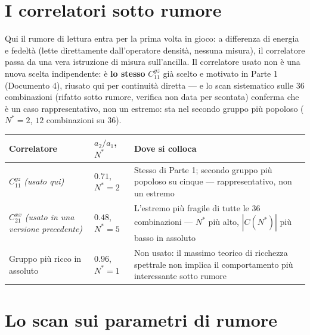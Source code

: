 \documentclass[11pt,a4paper]{article}
\begin{document}
\section{I correlatori sotto rumore}

Qui il rumore di lettura entra per la prima volta in gioco: a differenza
di energia e fedeltà (lette direttamente dall'operatore densità, nessuna
misura), il correlatore passa da una vera istruzione di misura
sull'ancilla. Il correlatore usato non è una nuova scelta indipendente:
è \textbf{lo stesso} $C_{11}^{yz}$ già scelto e motivato in Parte 1
(Documento 4), riusato qui per continuità diretta --- e lo scan
sistematico sulle 36 combinazioni (rifatto sotto rumore, verifica non
data per scontata) conferma che è un caso rappresentativo, non un
estremo: sta nel secondo gruppo più popoloso ($N^*=2$, $12$ combinazioni
su $36$).

\begin{center}
\small
\renewcommand{\arraystretch}{1.35}
\begin{tabular}{@{}p{3.4cm}p{3.0cm}p{7.0cm}@{}}
\toprule
\rowcolor{grigetto}
\textbf{Correlatore} & \textbf{$a_2/a_1$, $N^*$} & \textbf{Dove si colloca} \\
\midrule
$C_{11}^{yz}$ \textit{(usato qui)} &
$0.71$, $N^*=2$ &
Stesso di Parte 1; secondo gruppo più popoloso su cinque --- rappresentativo,
non un estremo \\
$C_{21}^{xx}$ \textit{(usato in una versione precedente)} &
$0.48$, $N^*=5$ &
L'estremo più fragile di tutte le 36 combinazioni --- $N^*$ più alto,
$|C(N^*)|$ più basso in assoluto \\
Gruppo più ricco in assoluto &
$0.96$, $N^*=1$ &
Non usato: il massimo teorico di ricchezza spettrale non implica il
comportamento più interessante sotto rumore \\
\bottomrule
\end{tabular}
\end{center}


\section{Lo scan sui parametri di rumore}
\end{document}
